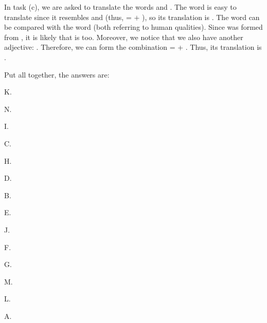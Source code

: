 \begin{refsection}
\begin{mysolution}
 In task (c), we are asked to translate the words  and . The word  is easy to translate since it resembles  and  (thus,  =  $+$ ), so its translation is . The word  can be compared with the word  (both referring to human qualities). Since  was formed from , it is likely that  is too. Moreover, we notice that we also have another adjective: . Therefore, we can form the combination  =  + . Thus, its translation is .



Put all together, the answers are:

\begin{assgts}
    \item
    \begin{enumerate}
    \begin{multicols}{7}
        \item K.
        \item N.
        \item I.
        \item C.
        \item H.
        \item D.
        \item B.
        \item E.
        \item J.
        \item F.
        \item G.
        \item M.
        \item L.
        \item A.
        \end{multicols}
    \end{enumerate}
    \item
    \begin{enumerate}[start = 15]
    \begin{multicols}{2}
        \item {}
        \item {}
        \item {}
        \item {}
        \item {}
        \item[] \hphantom{x}
        \end{multicols}
    \end{enumerate}


\end{assgts}
\end{mysolution}
\end{refsection}

